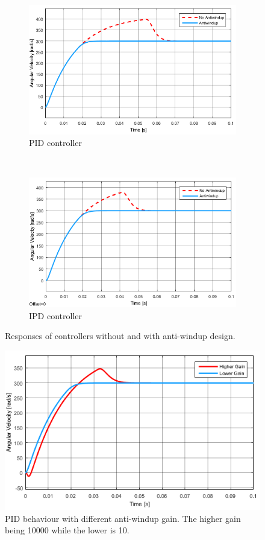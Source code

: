 \begin{figure}
	\centering
	\begin{subfigure}[b]{0.45\textwidth}
		\includegraphics[width=\textwidth]{graphics/pidwindupresponse}
		\caption{PID controller}
		\label{fig:pidwindupresponse}
	\end{subfigure}
	~ %
	\begin{subfigure}[b]{0.45\textwidth}
		\includegraphics[width=\textwidth]{graphics/ipdwindupresponse}
		\caption{IPD controller}
		\label{fig:ipdwindupresponse}
	\end{subfigure}
	\caption{Responses of controllers without and with anti-windup design.}\label{fig:antiwindupresponses}
\end{figure}

\begin{figure}[!h]
	\centering
	\includegraphics[width=.6\linewidth]{graphics/pidwindupvaluecomp}
	\caption{PID behaviour with different anti-windup gain. The higher gain being 10000 while the lower is 10.}
	\label{fig:pidwindupvaluecomp}
\end{figure}

